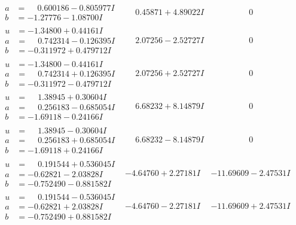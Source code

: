 \documentclass[1p]{elsarticle_modified}
\theoremstyle{definition}
\begin{document}
$$\begin{array}{c|c|c}
\begin{aligned}
a &= \phantom{-}0.600186 - 0.805977 I \\
b &= -1.27776 - 1.08700 I\end{aligned}
 & \phantom{-}0.45871 + 4.89022 I & \phantom{-0.000000 } 0 \\ \hline\begin{aligned}
u &= -1.34800 + 0.44161 I \\
a &= \phantom{-}0.742314 - 0.126395 I \\
b &= -0.311972 + 0.479712 I\end{aligned}
 & \phantom{-}2.07256 - 2.52727 I & \phantom{-0.000000 } 0 \\ \hline\begin{aligned}
u &= -1.34800 - 0.44161 I \\
a &= \phantom{-}0.742314 + 0.126395 I \\
b &= -0.311972 - 0.479712 I\end{aligned}
 & \phantom{-}2.07256 + 2.52727 I & \phantom{-0.000000 } 0 \\ \hline\begin{aligned}
u &= \phantom{-}1.38945 + 0.30604 I \\
a &= \phantom{-}0.256183 - 0.685054 I \\
b &= -1.69118 - 0.24166 I\end{aligned}
 & \phantom{-}6.68232 + 8.14879 I & \phantom{-0.000000 } 0 \\ \hline\begin{aligned}
u &= \phantom{-}1.38945 - 0.30604 I \\
a &= \phantom{-}0.256183 + 0.685054 I \\
b &= -1.69118 + 0.24166 I\end{aligned}
 & \phantom{-}6.68232 - 8.14879 I & \phantom{-0.000000 } 0 \\ \hline\begin{aligned}
u &= \phantom{-}0.191544 + 0.536045 I \\
a &= -0.62821 - 2.03828 I \\
b &= -0.752490 - 0.881582 I\end{aligned}
 & -4.64760 + 2.27181 I & -11.69609 - 2.47531 I \\ \hline\begin{aligned}
u &= \phantom{-}0.191544 - 0.536045 I \\
a &= -0.62821 + 2.03828 I \\
b &= -0.752490 + 0.881582 I\end{aligned}
 & -4.64760 - 2.27181 I & -11.69609 + 2.47531 I\\

\end{array}$$
\end{document}
